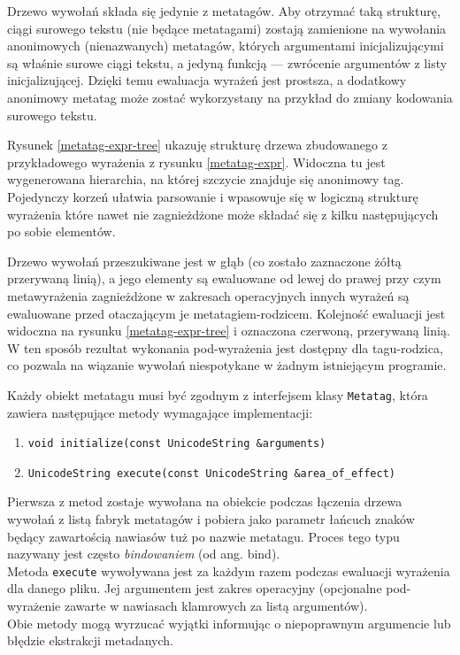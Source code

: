 \par
Drzewo wywołań składa się jedynie z metatagów. Aby otrzymać taką strukturę, ciągi surowego tekstu (nie będące metatagami) zostają zamienione na wywołania anonimowych (nienazwanych) metatagów, których argumentami inicjalizującymi są właśnie surowe ciągi tekstu, a jedyną funkcją --- zwrócenie argumentów z listy inicjalizującej. Dzięki temu ewaluacja wyrażeń jest prostsza, a dodatkowy anonimowy metatag może zostać wykorzystany na przykład do zmiany kodowania surowego tekstu.
\par
Rysunek \ref{metatag-expr-tree} ukazuję strukturę drzewa zbudowanego z przykładowego wyrażenia z rysunku \ref{metatag-expr}. Widoczna tu jest wygenerowana hierarchia, na której szczycie znajduje się anonimowy tag. Pojedynczy korzeń ułatwia parsowanie i wpasowuje się w logiczną strukturę wyrażenia które nawet nie zagnieżdżone może składać się z kilku następujących po sobie elementów.
\par
Drzewo wywołań przeszukiwane jest w głąb (co zostało zaznaczone żółtą przerywaną linią), a jego elementy są ewaluowane od lewej do prawej przy czym metawyrażenia zagnieżdżone w zakresach operacyjnych innych wyrażeń są ewaluowane przed otaczającym je metatagiem-rodzicem. Kolejność ewaluacji jest widoczna na rysunku \ref{metatag-expr-tree} i oznaczona czerwoną, przerywaną linią.  W ten sposób rezultat wykonania pod-wyrażenia jest dostępny dla tagu-rodzica, co pozwala na wiązanie wywołań niespotykane w żadnym istniejącym programie.
\par
Każdy obiekt metatagu musi być zgodnym z interfejsem klasy \texttt{Metatag}, która zawiera następujące metody wymagające implementacji:
\begin{enumerate}
\item \texttt{void initialize(const UnicodeString \&arguments)}
\item \texttt{UnicodeString execute(const UnicodeString \&area\_of\_effect)}
\end{enumerate}

Pierwsza z metod zostaje wywołana na obiekcie podczas łączenia drzewa wywołań z listą fabryk metatagów i pobiera jako parametr łańcuch znaków będący zawartością nawiasów tuż po nazwie metatagu. Proces tego typu nazywany jest często \textit{bindowaniem} (od ang. bind).\\
Metoda \texttt{execute} wywoływana jest za każdym razem podczas ewaluacji wyrażenia dla danego pliku. Jej argumentem jest zakres operacyjny (opcjonalne pod-wyrażenie zawarte w nawiasach klamrowych za listą argumentów).\\
Obie metody mogą wyrzucać wyjątki informując o niepoprawnym argumencie lub błędzie ekstrakcji metadanych.

